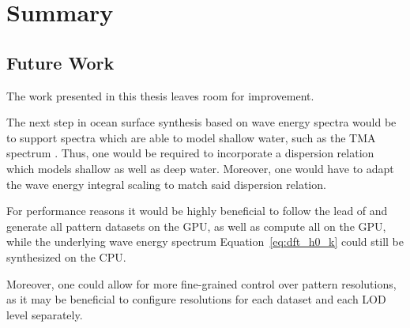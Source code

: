 \chapter{Summary}
\label{ch:summary}

\section{Future Work}
The work presented in this thesis leaves room for improvement.

The next step in ocean surface synthesis based on wave energy spectra would be
to support spectra which are able to model shallow water, such as the
TMA spectrum \citep{Hughes:1984}.
Thus, one would be required to incorporate a dispersion relation which models
shallow as well as deep water. Moreover, one would have
to adapt the wave energy integral scaling to match said dispersion relation.
\cite{Horvath:2015}

For performance reasons it would be highly beneficial to follow the lead of
\cite{misc:oceanlightingfft} and generate all pattern datasets on the GPU,
as well as compute all \InvDiscreteFourierTransforms on the GPU, while the
underlying wave energy spectrum Equation~\ref{eq:dft_h0_k} could still be synthesized on the CPU.

Moreover, one could allow for more fine-grained control over pattern resolutions,
as it may be beneficial to configure resolutions for each dataset and each LOD
level separately.
